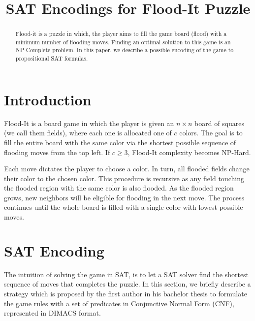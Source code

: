 \documentclass[conference]{IEEEtran}
\newcommand{\bSize}{\ensuremath{n}\xspace}
\newcommand{\clr}{\ensuremath{c}\xspace}
\begin{document}
\title{SAT Encodings for Flood-It Puzzle
}

\author{
	\and
}

\maketitle

\begin{abstract}
Flood-it is a puzzle in which, the player aims to fill the game board (flood) with a minimum number of flooding moves. Finding an optimal solution to this game is an NP-Complete problem. In this paper, we describe a possible encoding of the game to propositional SAT formulas. 
\end{abstract}

\section{Introduction}
Flood-It is a board game in which the player is given an $\bSize\times\bSize$ board of squares (we call them fields), where each one is allocated one of \clr colors. The goal is to fill the entire board with the same color via the shortest possible sequence of flooding moves from the top left. If $\clr \ge 3$, Flood-It complexity becomes NP-Hard\cite{floodit, floodit2}.

Each move dictates the player to choose a color. In turn, all flooded fields change their color to the chosen color. This procedure is recursive as any field touching the flooded region with the same color is also flooded. As the flooded region grows, new neighbors will be eligible for flooding in the next move. The process continues until the whole board is filled with a single color with lowest possible moves.

\section{SAT Encoding}
The intuition of solving the game in SAT, is to let a SAT solver find the shortest sequence of moves that completes the puzzle. In this section, we briefly describe a strategy which is proposed by the first author in his bachelor thesis\cite{thesis} to formulate the game rules with a set of predicates in Conjunctive Normal Form (CNF), represented in DIMACS format\cite{dimacs}.
\end{document}
